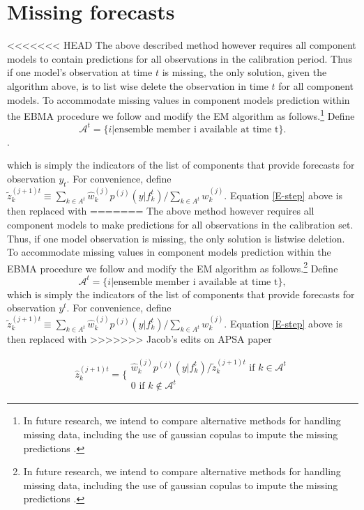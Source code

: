 \documentclass[12pt,fullpage,endnotes]{article}
\begin{document}
\section{Missing forecasts}
\label{missing}
<<<<<<< HEAD
The above described method however requires all component models to contain predictions for all observations in the calibration period. Thus if one model's observation at time $t$ is missing, the only solution, given the algorithm above, is to list wise delete the observation in time $t$ for all component models. To accommodate missing values in component models prediction within the EBMA procedure we follow \citet{Fraley:2010} and modify the EM algorithm as follows.\footnote{In future research, we intend to compare alternative methods for handling missing data, including the use of gaussian copulas to impute the missing predictions \citep{Hoff:2007}.}  Define $$\mathcal{A}^t = \{i|\mbox{ensemble member i available at time t}\}.$$.

\noindent which is simply the indicators of the list of components that provide forecasts for observation $y_t$.   For convenience, define $\tilde{z}_k^{(j+1)t} \equiv {{\underset{k \in A^t}{\sum}}\hat{w}^{(j)}_kp^{(j)}(y|f_{k}^{t})}/{\underset{k \in A^t}\sum w_k^{(j)}}$.  Equation \ref{E-step} above is then replaced with
=======
The above method however requires all component models to make
predictions for all observations in the calibration set. Thus, if one
model observation is missing, the only solution is listwise
deletion. To accommodate missing values in component models prediction
within the EBMA procedure we follow \citet{Fraley:2010} and modify the
EM algorithm as follows.\footnote{In future research, we intend to
  compare alternative methods for handling missing data, including the
  use of gaussian copulas to impute the missing predictions
  \citep{Hoff:2007}.}  Define $$\mathcal{A}^t = \{i|\mbox{ensemble
  member i available at time t}\},$$\noindent which is simply the indicators of the list of components
that provide forecasts for observation $y^t$.  For convenience, define
$\tilde{z}_k^{(j+1)t} \equiv {{\underset{k \in
      A^t}{\sum}}\hat{w}^{(j)}_kp^{(j)}(y|f_{k}^{t})}/{\underset{k \in
    A^t}\sum w_k^{(j)}}$.  Equation \ref{E-step} above is then
replaced with
>>>>>>> Jacob's edits on APSA paper

\begin{equation}
\hat{z}^{(j+1)t}_{k} = \Bigg\{ \begin{array}{c} {\hat{w}^{(j)}_k p^{(j)}(y|f_{k}^{t})}/{\tilde{z}_k^{(j+1)t} } \mbox{ if } k \in \mathcal{A}^t\\ 0 \mbox{ if } k \notin \mathcal{A}^t \end{array}
\end{equation}
\end{document}
